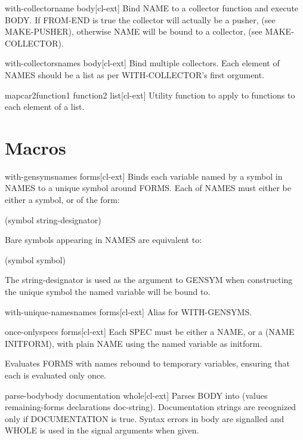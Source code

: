 \documentclass[10pt,english]{book}
\begin{document}
\begin{macro}{with-collector}{name \body body}[cl-ext]
  Bind NAME to a collector function and execute BODY. If
  FROM-END is true the collector will actually be a pusher, (see
  MAKE-PUSHER), otherwise NAME will be bound to a collector,
  (see MAKE-COLLECTOR).
\end{macro}

\begin{macro}{with-collectors}{names \body body}[cl-ext]
  Bind multiple collectors. Each element of NAMES should be a
  list as per WITH-COLLECTOR's first orgument.
\end{macro}

\begin{function}{mapcar2}{function1 function2 list}[cl-ext]
  Utility function to apply to functions to each element of a list.
\end{function}


\section{Macros}
\label{sec:macros}

\begin{macro}{with-gensyms}{names \body forms}[cl-ext]
  Binds each variable named by a symbol in NAMES to a unique symbol around
FORMS. Each of NAMES must either be either a symbol, or of the form:

 (symbol string-designator)

Bare symbols appearing in NAMES are equivalent to:

 (symbol symbol)

The string-designator is used as the argument to GENSYM when constructing the
unique symbol the named variable will be bound to.
\end{macro}

\begin{macro}{with-unique-names}{names \body forms}[cl-ext]
  Alias for WITH-GENSYMS.
\end{macro}

\begin{macro}{once-only}{specs \body forms}[cl-ext]
  Each SPEC must be either a NAME, or a (NAME INITFORM), with plain
NAME using the named variable as initform.

Evaluates FORMS with names rebound to temporary variables, ensuring
that each is evaluated only once.
\end{macro}

\begin{function}{parse-body}{body \key documentation whole}[cl-ext]
  Parses BODY into (values remaining-forms declarations doc-string).
Documentation strings are recognized only if DOCUMENTATION is true.
Syntax errors in body are signalled and WHOLE is used in the signal
arguments when given.
\end{function}
\end{document}
